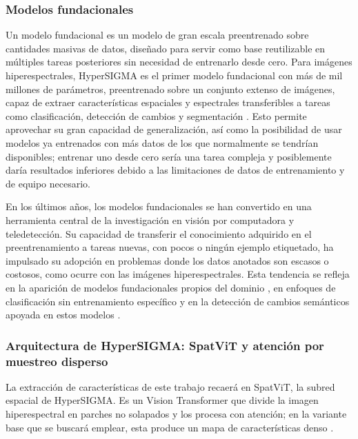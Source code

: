 \subsubsection{Modelos fundacionales}

Un modelo fundacional es un modelo de gran escala preentrenado sobre cantidades masivas de datos, diseñado para servir como base reutilizable en múltiples tareas posteriores sin necesidad de entrenarlo desde cero. Para imágenes hiperespectrales, HyperSIGMA es el primer modelo fundacional con más de mil millones de parámetros, preentrenado sobre un conjunto extenso de imágenes, capaz de extraer características espaciales y espectrales transferibles a tareas como clasificación, detección de cambios y segmentación \parencite{wang2024hypersigma}. Esto permite aprovechar su gran capacidad de generalización, así como la posibilidad de usar modelos ya entrenados con más datos de los que normalmente se tendrían disponibles; entrenar uno desde cero sería una tarea compleja y posiblemente daría resultados inferiores debido a las limitaciones de datos de entrenamiento y de equipo necesario.

En los últimos años, los modelos fundacionales se han convertido en una herramienta central de la investigación en visión por computadora y teledetección. Su capacidad de transferir el conocimiento adquirido en el preentrenamiento a tareas nuevas, con pocos o ningún ejemplo etiquetado, ha impulsado su adopción en problemas donde los datos anotados son escasos o costosos, como ocurre con las imágenes hiperespectrales. Esta tendencia se refleja en la aparición de modelos fundacionales propios del dominio \parencite{wang2024hypersigma}, en enfoques de clasificación sin entrenamiento específico \parencite{pang2025special} y en la detección de cambios semánticos apoyada en estos modelos \parencite{zhu2025semanticcd}.

\subsubsection{Arquitectura de HyperSIGMA: SpatViT y atención por muestreo disperso}

La extracción de características de este trabajo recaerá en SpatViT, la subred espacial de HyperSIGMA. Es un Vision Transformer que divide la imagen hiperespectral en parches no solapados y los procesa con atención; en la variante base que se buscará emplear, esta produce un mapa de características denso \parencite{wang2024hypersigma}.


